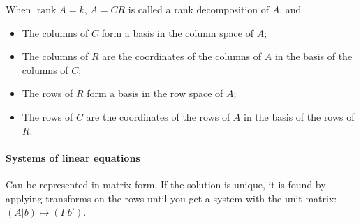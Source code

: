 \documentclass{article}
\begin{document}
When $\operatorname{rank} A=k$, $A=CR$ is called a rank decomposition of $A$, and

\begin{itemize}
    \item The columns of $C$ form a basis in the column space of $A$;
    \item The columns of $R$ are the coordinates of the columns of $A$ in the basis of the columns of $C$;
    \item The rows of $R$ form a basis in the row space of $A$;
    \item The rows of $C$ are the coordinates of the rows of $A$ in the basis of the rows of $R$.
\end{itemize}

\paragraph{Systems of linear equations} Can be represented in matrix form. If the solution is unique, it is found by applying transforms on the rows until you get a system with the unit matrix: $(A|b) \mapsto (I|b')$.
\end{document}
